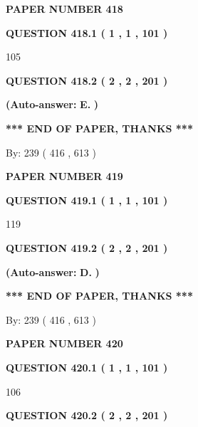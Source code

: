 \documentclass[12pt]{article}
\begin{document}
   
\newpage 
\setcounter{page}{ 
   418001 } 
   
   
 {\textbf{ \Large{ PAPER NUMBER  418  }}}
   
   
   
   
  
  
{\textbf{\large{QUESTION
418.1 
 ( 1 , 1 , 101 )
}}}

105
  
  
{\textbf{\large{QUESTION
418.2 
 ( 2 , 2 , 201 )
}}}
 
 
{\textbf{(Auto-answer:}}
{\textbf{\large{
E.}}}
{\textbf{)}}
 
 
   
   
   
   
\vspace{1.0in} 
{\textbf{\large{ *** END OF PAPER, THANKS *** }}} 
   
   
\hspace{1.0in} By: 
 239 ( 416 ,  613 )
   
   
   
   
\newpage 
\setcounter{page}{ 
   419001 } 
   
   
 {\textbf{ \Large{ PAPER NUMBER  419  }}}
   
   
   
   
  
  
{\textbf{\large{QUESTION
419.1 
 ( 1 , 1 , 101 )
}}}

119
  
  
{\textbf{\large{QUESTION
419.2 
 ( 2 , 2 , 201 )
}}}
 
 
{\textbf{(Auto-answer:}}
{\textbf{\large{
D.}}}
{\textbf{)}}
 
 
   
   
   
   
\vspace{1.0in} 
{\textbf{\large{ *** END OF PAPER, THANKS *** }}} 
   
   
\hspace{1.0in} By: 
 239 ( 416 ,  613 )
   
   
   
   
\newpage 
\setcounter{page}{ 
   420001 } 
   
   
 {\textbf{ \Large{ PAPER NUMBER  420  }}}
   
   
   
   
  
  
{\textbf{\large{QUESTION
420.1 
 ( 1 , 1 , 101 )
}}}

106
  
  
{\textbf{\large{QUESTION
420.2 
 ( 2 , 2 , 201 )
}}}
 
\end{document}
